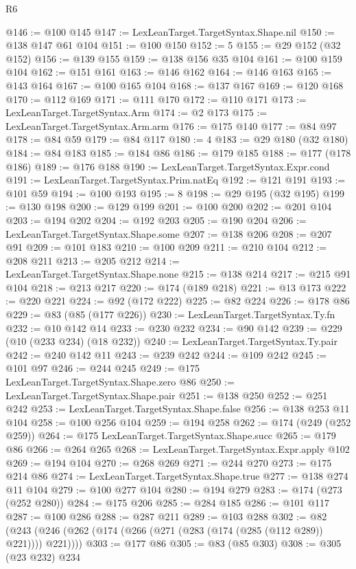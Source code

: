 \begin{lexlean}{R6}
\begin{coremodule}
@146 := @100 @145
@147 := LexLeanTarget.TargetSyntax.Shape.nil
@150 := @138 @147 @61 @104
@151 := @100 @150
@152 := 5
@155 := @29 @152 (@32 @152)
@156 := @139 @155
@159 := @138 @156 @35 @104
@161 := @100 @159 @104
@162 := @151 @161
@163 := @146 @162
@164 := @146 @163
@165 := @143 @164
@167 := @100 @165 @104
@168 := @137 @167
@169 := @120 @168
@170 := @112 @169
@171 := @111 @170
@172 := @110 @171
@173 := LexLeanTarget.TargetSyntax.Arm
@174 := @2 @173
@175 := LexLeanTarget.TargetSyntax.Arm.arm
@176 := @175 @140
@177 := @84 @97
@178 := @84 @59
@179 := @84 @117
@180 := 4
@183 := @29 @180 (@32 @180)
@184 := @84 @183
@185 := @184 @86
@186 := @179 @185
@188 := @177 (@178 @186)
@189 := @176 @188
@190 := LexLeanTarget.TargetSyntax.Expr.cond
@191 := LexLeanTarget.TargetSyntax.Prim.natEq
@192 := @121 @191
@193 := @101 @59
@194 := @100 @193
@195 := 8
@198 := @29 @195 (@32 @195)
@199 := @130 @198
@200 := @129 @199
@201 := @100 @200
@202 := @201 @104
@203 := @194 @202
@204 := @192 @203
@205 := @190 @204
@206 := LexLeanTarget.TargetSyntax.Shape.some
@207 := @138 @206
@208 := @207 @91
@209 := @101 @183
@210 := @100 @209
@211 := @210 @104
@212 := @208 @211
@213 := @205 @212
@214 := LexLeanTarget.TargetSyntax.Shape.none
@215 := @138 @214
@217 := @215 @91 @104
@218 := @213 @217
@220 := @174 (@189 @218)
@221 := @13 @173
@222 := @220 @221
@224 := @92 (@172 @222)
@225 := @82 @224
@226 := @178 @86
@229 := @83 (@85 (@177 @226))
@230 := LexLeanTarget.TargetSyntax.Ty.fn
@232 := @10 @142 @14
@233 := @230 @232
@234 := @90 @142
@239 := @229 (@10 (@233 @234) (@18 @232))
@240 := LexLeanTarget.TargetSyntax.Ty.pair
@242 := @240 @142 @11
@243 := @239 @242
@244 := @109 @242
@245 := @101 @97
@246 := @244 @245
@249 := @175 LexLeanTarget.TargetSyntax.Shape.zero @86
@250 := LexLeanTarget.TargetSyntax.Shape.pair
@251 := @138 @250
@252 := @251 @242
@253 := LexLeanTarget.TargetSyntax.Shape.false
@256 := @138 @253 @11 @104
@258 := @100 @256 @104
@259 := @194 @258
@262 := @174 (@249 (@252 @259))
@264 := @175 LexLeanTarget.TargetSyntax.Shape.succ
@265 := @179 @86
@266 := @264 @265
@268 := LexLeanTarget.TargetSyntax.Expr.apply @102
@269 := @194 @104
@270 := @268 @269
@271 := @244 @270
@273 := @175 @214 @86
@274 := LexLeanTarget.TargetSyntax.Shape.true
@277 := @138 @274 @11 @104
@279 := @100 @277 @104
@280 := @194 @279
@283 := @174 (@273 (@252 @280))
@284 := @175 @206
@285 := @284 @185
@286 := @101 @117
@287 := @100 @286
@288 := @287 @211
@289 := @103 @288
@302 := @82 (@243 (@246 (@262 (@174 (@266 (@271 (@283 (@174 (@285 (@112 @289)) @221)))) @221))))
@303 := @177 @86
@305 := @83 (@85 @303)
@308 := @305 (@23 @232) @234

\end{coremodule}
\end{lexlean}
